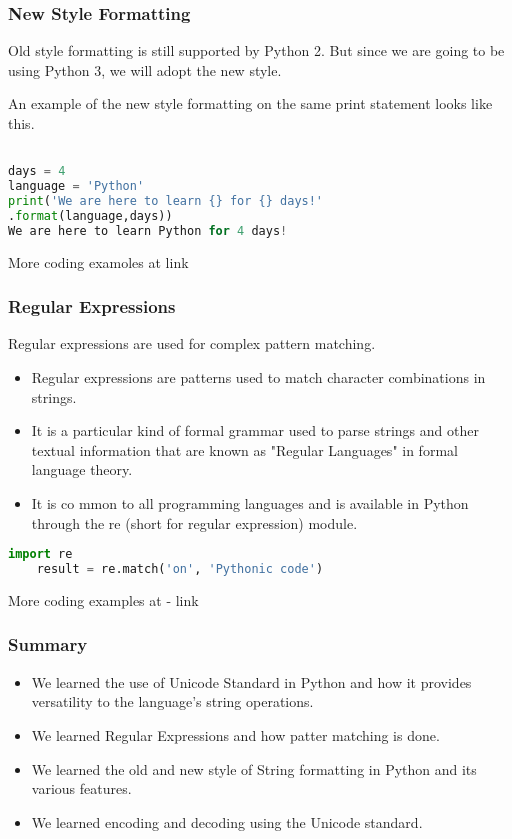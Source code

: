 \documentclass{beamer}
\begin{document}
\begin{frame}[fragile]
\frametitle{New Style Formatting}
Old style formatting is still supported by Python 2. But since we are going to be using Python 3, we will adopt the new style.


An example of the new style formatting on the same print statement looks like this.
\begin{lstlisting}[language=Python]

days = 4
language = 'Python'
print('We are here to learn {} for {} days!'
.format(language,days))
We are here to learn Python for 4 days!
\end{lstlisting}
More coding examoles at link
\end{frame}

\begin{frame}[fragile]
\frametitle{Regular Expressions}
Regular expressions are used for complex pattern matching.
\begin{itemize}
\item Regular expressions are patterns used to match character combinations in strings.
\item It is a particular kind of formal grammar used to parse strings and other textual information that are known as "Regular Languages" in formal language theory.
\item It is co	mmon to all programming languages and is available in Python through the re (short for regular expression) module.
\end{itemize}
\begin{lstlisting}[language=Python]
	import re
	result = re.match('on', 'Pythonic code')
\end{lstlisting}
More coding examples at - link
\end{frame}

\begin{frame}
\frametitle{Summary}
\begin{itemize}
\item We learned the use of Unicode Standard in Python and how it provides versatility to the language's string operations.
\item We learned Regular Expressions and how patter matching is done.
\item We learned the old and new style of String formatting in Python and its various features.
\item We learned encoding and decoding using the Unicode standard. 
\end{itemize}
\end{frame}
\end{document}
